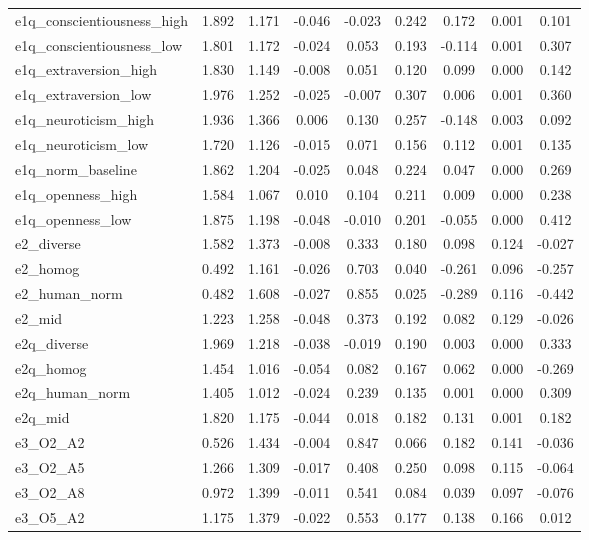\documentclass[11pt]{article}
\begin{document}
\begin{longtable}{lcccccccc}
e1q\_conscientiousness\_high & 1.892 & 1.171 & -0.046 & -0.023 & 0.242 & 0.172 & 0.001 & 0.101 \\
e1q\_conscientiousness\_low & 1.801 & 1.172 & -0.024 & 0.053 & 0.193 & -0.114 & 0.001 & 0.307 \\
e1q\_extraversion\_high & 1.830 & 1.149 & -0.008 & 0.051 & 0.120 & 0.099 & 0.000 & 0.142 \\
e1q\_extraversion\_low & 1.976 & 1.252 & -0.025 & -0.007 & 0.307 & 0.006 & 0.001 & 0.360 \\
e1q\_neuroticism\_high & 1.936 & 1.366 & 0.006 & 0.130 & 0.257 & -0.148 & 0.003 & 0.092 \\
e1q\_neuroticism\_low & 1.720 & 1.126 & -0.015 & 0.071 & 0.156 & 0.112 & 0.001 & 0.135 \\
e1q\_norm\_baseline & 1.862 & 1.204 & -0.025 & 0.048 & 0.224 & 0.047 & 0.000 & 0.269 \\
e1q\_openness\_high & 1.584 & 1.067 & 0.010 & 0.104 & 0.211 & 0.009 & 0.000 & 0.238 \\
e1q\_openness\_low & 1.875 & 1.198 & -0.048 & -0.010 & 0.201 & -0.055 & 0.000 & 0.412 \\
e2\_diverse & 1.582 & 1.373 & -0.008 & 0.333 & 0.180 & 0.098 & 0.124 & -0.027 \\
e2\_homog & 0.492 & 1.161 & -0.026 & 0.703 & 0.040 & -0.261 & 0.096 & -0.257 \\
e2\_human\_norm & 0.482 & 1.608 & -0.027 & 0.855 & 0.025 & -0.289 & 0.116 & -0.442 \\
e2\_mid & 1.223 & 1.258 & -0.048 & 0.373 & 0.192 & 0.082 & 0.129 & -0.026 \\
e2q\_diverse & 1.969 & 1.218 & -0.038 & -0.019 & 0.190 & 0.003 & 0.000 & 0.333 \\
e2q\_homog & 1.454 & 1.016 & -0.054 & 0.082 & 0.167 & 0.062 & 0.000 & -0.269 \\
e2q\_human\_norm & 1.405 & 1.012 & -0.024 & 0.239 & 0.135 & 0.001 & 0.000 & 0.309 \\
e2q\_mid & 1.820 & 1.175 & -0.044 & 0.018 & 0.182 & 0.131 & 0.001 & 0.182 \\
e3\_O2\_A2 & 0.526 & 1.434 & -0.004 & 0.847 & 0.066 & 0.182 & 0.141 & -0.036 \\
e3\_O2\_A5 & 1.266 & 1.309 & -0.017 & 0.408 & 0.250 & 0.098 & 0.115 & -0.064 \\
e3\_O2\_A8 & 0.972 & 1.399 & -0.011 & 0.541 & 0.084 & 0.039 & 0.097 & -0.076 \\
e3\_O5\_A2 & 1.175 & 1.379 & -0.022 & 0.553 & 0.177 & 0.138 & 0.166 & 0.012 \\

\end{longtable}
\end{document}
